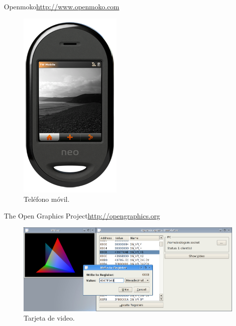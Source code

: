 \documentclass{beamer}
\begin{document}
\begin{frame}{Openmoko}{\url{http://www.openmoko.com}}
  \begin{figure}
    \includegraphics[scale=0.65]{img/freerunner_shop1}
    \caption{Teléfono móvil.}
    \label{fig:openmoko}
  \end{figure}
\end{frame}

\begin{frame}{The Open Graphics Project}{\url{http://opengraphics.org}}
  \begin{figure}
    \includegraphics[scale=0.35]{img/ogsim-screen1}
    \caption{Tarjeta de video.}
    \label{fig:ogp}
  \end{figure}
\end{frame}
\end{document}
